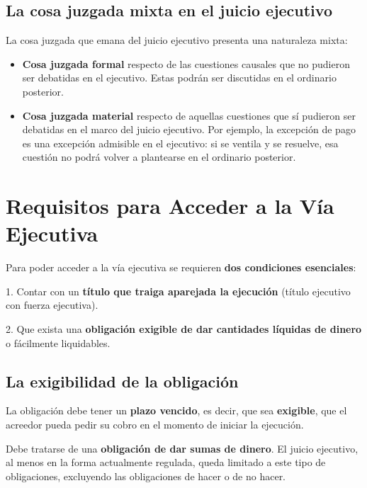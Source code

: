 \documentclass[12pt,oneside]{book}
\begin{document}
\subsection{La cosa juzgada mixta en el juicio ejecutivo}

La cosa juzgada que emana del juicio ejecutivo presenta una naturaleza mixta:

\begin{itemize}
    \item \textbf{Cosa juzgada formal} respecto de las cuestiones causales que no pudieron ser debatidas en el ejecutivo. Estas podrán ser discutidas en el ordinario posterior.
    
    \item \textbf{Cosa juzgada material} respecto de aquellas cuestiones que sí pudieron ser debatidas en el marco del juicio ejecutivo. Por ejemplo, la excepción de pago es una excepción admisible en el ejecutivo: si se ventila y se resuelve, esa cuestión no podrá volver a plantearse en el ordinario posterior.
\end{itemize}

\section{Requisitos para Acceder a la Vía Ejecutiva}

Para poder acceder a la vía ejecutiva se requieren \textbf{dos condiciones esenciales}:

\begin{important}
1. Contar con un \textbf{título que traiga aparejada la ejecución} (título ejecutivo con fuerza ejecutiva).

2. Que exista una \textbf{obligación exigible de dar cantidades líquidas de dinero} o fácilmente liquidables.
\end{important}

\subsection{La exigibilidad de la obligación}

La obligación debe tener un \textbf{plazo vencido}, es decir, que sea \textbf{exigible}, que el acreedor pueda pedir su cobro en el momento de iniciar la ejecución.

Debe tratarse de una \textbf{obligación de dar sumas de dinero}. El juicio ejecutivo, al menos en la forma actualmente regulada, queda limitado a este tipo de obligaciones, excluyendo las obligaciones de hacer o de no hacer.
\end{document}
